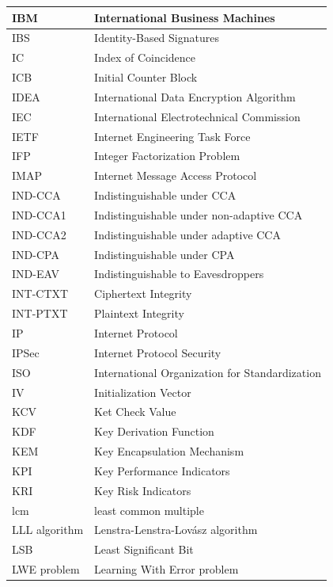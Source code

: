 \documentclass[a4paper, 12pt]{book} %
\begin{document}
\begin{longtable}{||lp{11cm}||}
    IBM & International Business Machines \\ \hline 
    IBS & Identity-Based Signatures \\ \hline 
    IC & Index of Coincidence \\ \hline 
    ICB & Initial Counter Block \\ \hline 
    IDEA & International Data Encryption Algorithm \\ \hline 
    IEC & International Electrotechnical Commission \\ \hline 
    IETF &  Internet Engineering Task Force \\ \hline 
    IFP & Integer Factorization Problem \\ \hline 
    IMAP & Internet Message Access Protocol \\ \hline 
    IND-CCA & Indistinguishable under CCA \\ \hline 
    IND-CCA1 & Indistinguishable under non-adaptive CCA \\ \hline 
    IND-CCA2 & Indistinguishable under adaptive CCA \\ \hline 
    IND-CPA & Indistinguishable under CPA \\ \hline 
    IND-EAV & Indistinguishable to Eavesdroppers \\ \hline 
    INT-CTXT & Ciphertext Integrity \\ \hline 
    INT-PTXT & Plaintext Integrity \\ \hline 
    IP & Internet Protocol \\ \hline 
    IPSec & Internet Protocol Security \\ \hline 
    ISO & International Organization for Standardization \\ \hline 
    IV & Initialization Vector \\ \hline 
    KCV & Ket Check Value \\ \hline 
    KDF & Key Derivation Function \\ \hline 
    KEM & Key Encapsulation Mechanism \\ \hline 
    KPI & Key Performance Indicators \\ \hline 
    KRI & Key Risk Indicators \\ \hline 
    lcm & least common multiple \\ \hline 
    LLL algorithm & Lenstra-Lenstra-Lov\'asz algorithm \\ \hline 
    LSB & Least Significant Bit \\ \hline 
    LWE problem & Learning With Error problem \\ \hline  

\end{longtable}
\end{document}
